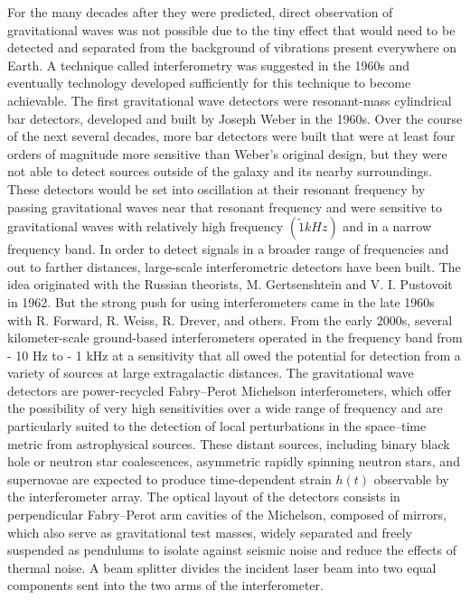 \documentclass[binding=0.6cm, LaM]{sapthesis}
\begin{document}
	For the many decades after they were predicted, direct observation of gravitational waves was not possible 
	due to the tiny effect that would need to be detected and separated from the background of vibrations present everywhere on Earth.
	A technique called interferometry was suggested in the 1960s and eventually technology developed  
	sufficiently for this technique to become achievable.
	The first gravitational wave detectors were resonant-mass cylindrical bar detectors, 
	developed and built by Joseph Weber in the 1960s.
	Over the course of the next several decades, more bar detectors were built that were at least 
	four orders of magnitude more sensitive than Weber’s original design, 
	but they were not able to detect sources outside of the galaxy and its nearby surroundings.
	These detectors would be set into oscillation at their resonant frequency by passing gravitational waves 
	near that resonant frequency and were sensitive to gravitational waves with relatively high frequency $(\tilde 1 kHz)$ 
	and in a narrow frequency band. In order to detect signals in a broader range of frequencies and out to farther distances, 
	large-scale interferometric detectors have been built. 
	The idea originated with the Russian theorists, M. Gertsenshtein and V. I. Pustovoit in 1962. 
	But the strong push for using interferometers came in the late 1960s with R. Forward, R. Weiss, 
	R. Drever, and others. From the early 2000s, several kilometer-scale ground-based interferometers 
	operated in the frequency band from - 10 Hz to - 1 kHz at a sensitivity that all
	owed the potential for detection from a variety of sources at large extragalactic distances.
	The gravitational wave detectors are power-recycled Fabry–Perot Michelson interferometers, 
	which offer the possibility of very high sensitivities over a wide range of frequency and 
	are particularly suited to the detection of local perturbations in the space–time metric from astrophysical sources.
	These distant sources, including binary black hole or neutron star coalescences, asymmetric rapidly spinning neutron stars, 
	and supernovae are expected to produce time-dependent strain $h(t)$ observable by the interferometer array.
	The optical layout of the detectors consists in perpendicular Fabry–Perot arm cavities of the Michelson, 
	composed of mirrors, which also serve as gravitational test masses, widely separated and 
	freely suspended as pendulums to isolate against seismic noise and reduce the effects of thermal noise.
	A beam splitter divides the incident laser beam into two equal components sent into the two arms of the interferometer. 
\end{document}
